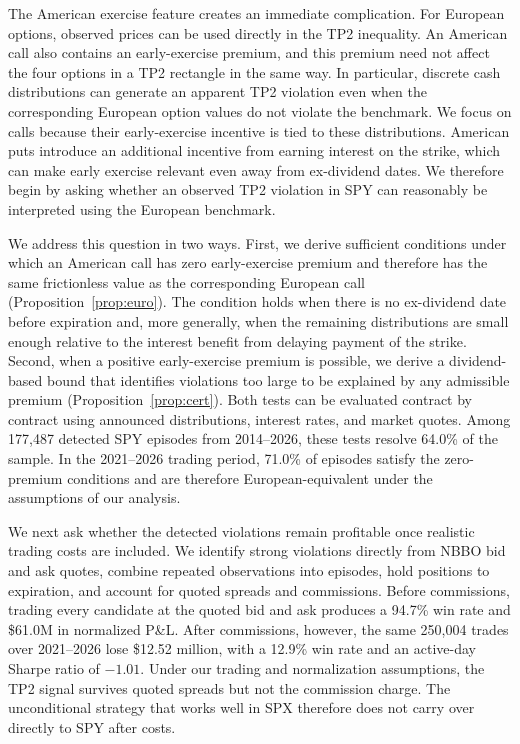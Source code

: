 \documentclass[sigconf,review,anonymous]{acmart}
\begin{document}
The American exercise feature creates an immediate complication. For European options, observed prices can be used directly in the TP2 inequality. An American call also contains an early-exercise premium, and this premium need not affect the four options in a TP2 rectangle in the same way. In particular, discrete cash distributions can generate an apparent TP2 violation even when the corresponding European option values do not violate the benchmark. We focus on calls because their early-exercise incentive is tied to these distributions. American puts introduce an additional incentive from earning interest on the strike, which can make early exercise relevant even away from ex-dividend dates. We therefore begin by asking whether an observed TP2 violation in SPY can reasonably be interpreted using the European benchmark.

We address this question in two ways. First, we derive sufficient conditions under which an American call has zero early-exercise premium and therefore has the same frictionless value as the corresponding European call (Proposition~\ref{prop:euro}). The condition holds when there is no ex-dividend date before expiration and, more generally, when the remaining distributions are small enough relative to the interest benefit from delaying payment of the strike. Second, when a positive early-exercise premium is possible, we derive a dividend-based bound that identifies violations too large to be explained by any admissible premium (Proposition~\ref{prop:cert}). Both tests can be evaluated contract by contract using announced distributions, interest rates, and market quotes. Among 177{,}487 detected SPY episodes from 2014--2026, these tests resolve 64.0\% of the sample. In the 2021--2026 trading period, 71.0\% of episodes satisfy the zero-premium conditions and are therefore European-equivalent under the assumptions of our analysis.

We next ask whether the detected violations remain profitable once realistic trading costs are included. We identify strong violations directly from NBBO bid and ask quotes, combine repeated observations into episodes, hold positions to expiration, and account for quoted spreads and commissions. Before commissions, trading every candidate at the quoted bid and ask produces a 94.7\% win rate and \$61.0M in normalized P\&L. After commissions, however, the same 250{,}004 trades over 2021--2026 lose \$12.52 million, with a 12.9\% win rate and an active-day Sharpe ratio of $-1.01$. Under our trading and normalization assumptions, the TP2 signal survives quoted spreads but not the commission charge. The unconditional strategy that works well in SPX therefore does not carry over directly to SPY after costs.
\end{document}
